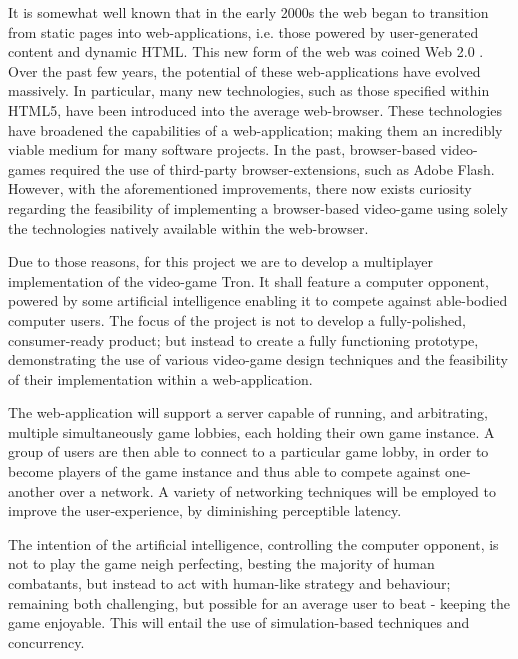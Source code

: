 \documentclass{standalone}
\begin{document}
	It is somewhat well known that in the early 2000s the web began to transition from static pages into web-applications, i.e. those powered by user-generated content and dynamic HTML. This new form of the web was coined Web 2.0 \parencite{Web20}. Over the past few years, the potential of these web-applications have evolved massively. In particular, many new technologies, such as those specified within HTML5, have been introduced into the average web-browser. These technologies have broadened the capabilities of a web-application; making them an incredibly viable medium for many software projects. In the past, browser-based video-games required the use of third-party browser-extensions, such as Adobe Flash. However, with the aforementioned improvements, there now exists curiosity regarding the feasibility of implementing a browser-based video-game using solely the technologies natively available within the web-browser.

	Due to those reasons, for this project we are to develop a multiplayer implementation of the video-game Tron. It shall feature a computer opponent, powered by some artificial intelligence enabling it to compete against able-bodied computer users. The focus of the project is not to develop a fully-polished, consumer-ready product; but instead to create a fully functioning prototype, demonstrating the use of various video-game design techniques and the feasibility of their implementation within a web-application. 

	The web-application will support a server capable of running, and arbitrating, multiple simultaneously game lobbies, each holding their own game instance. A group of users are then able to connect to a particular game lobby, in order to become players of the game instance and thus able to compete against one-another over a network. A variety of networking techniques will be employed to improve the user-experience, by diminishing  perceptible latency.

	The intention of the artificial intelligence, controlling the computer opponent, is not to play the game neigh perfecting, besting the majority of human combatants, but instead to act with human-like strategy and behaviour; remaining both challenging, but possible for an average user to beat - keeping the game enjoyable. This will entail the use of simulation-based techniques and concurrency.
\end{document}

